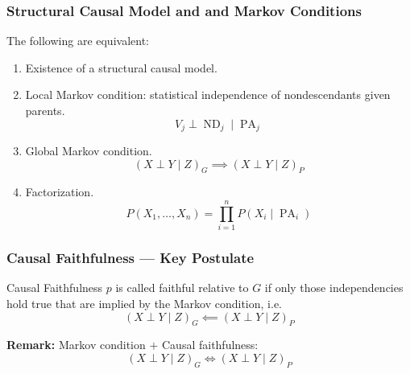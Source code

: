 \documentclass[UTF8,11pt,colorlinks,compress,openany]{beamer}%
\begin{document}
\begin{frame}\frametitle{Structural Causal Model and and Markov Conditions}
\begin{theorem}
The following are equivalent:
\begin{enumerate}
	\item Existence of a structural causal model.
	\item Local Markov condition: statistical independence of nondescendants given parents.
\[V_j\perp \operatorname{ND}_j\mid \operatorname{PA}_j\]
	\item Global Markov condition.
	\[(X\perp Y\mid Z)_G\implies(X\perp Y\mid Z)_P\]
	\item Factorization.
	\[P(X_1,\dots,X_n)=\prod_{i=1}^nP(X_i\mid\operatorname{PA}_i)\]
\end{enumerate}
\end{theorem}
\end{frame}

\begin{frame}\frametitle{Causal Faithfulness --- Key Postulate}
\begin{block}{Causal Faithfulness}
$p$ is called faithful relative to $G$ if only those independencies hold true that are implied by the Markov condition, i.e.
	\[(X\perp Y\mid Z)_G\impliedby (X\perp Y\mid Z)_P\]
\end{block}
\textbf{Remark:} Markov condition $+$ Causal faithfulness:
	\[(X\perp Y\mid Z)_G\iff (X\perp Y\mid Z)_P\]
\end{frame}
\end{document}

